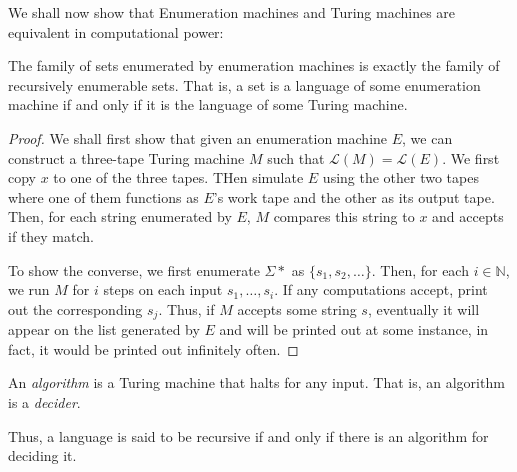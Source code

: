 We shall now show that Enumeration machines and Turing machines are equivalent in computational power:
\begin{theorem}
    The family of sets enumerated by enumeration machines is exactly the family of recursively enumerable sets. That is, a set is a language of some enumeration machine if and only if it is the language of some Turing machine.
\end{theorem}
\begin{proof}
    We shall first show that given an enumeration machine $E$, we can construct a three-tape Turing machine $M$ such that $\mathcal{L}(M) = \mathcal{L}(E)$. We first copy $x$ to one of the three tapes. THen simulate $E$ using the other two tapes where one of them functions as $E$'s work tape and the other as its output tape. Then, for each string enumerated by $E$, $M$ compares this string to $x$ and accepts if they match.

    To show the converse, we first enumerate $\Sigma*$ as $\{s_1, s_2,\ldots\}$. Then, for each $i\in\mathbb{N}$, we run $M$ for $i$ steps on each input $s_1,\ldots,s_i$. If any computations accept, print out the corresponding $s_j$. Thus, if $M$ accepts some string $s$, eventually it will appear on the list generated by $E$ and will be printed out at some instance, in fact, it would be printed out infinitely often.
\end{proof}

\begin{definition}[Algorithm]
    An \textit{algorithm} is a Turing machine that halts for any input. That is, an algorithm is a \textit{decider}.
\end{definition}

Thus, a language is said to be recursive if and only if there is an algorithm for deciding it.